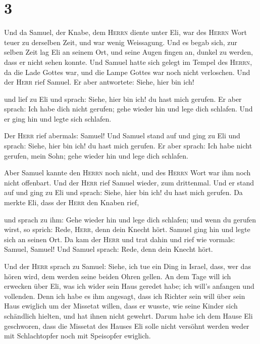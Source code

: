 \hypertarget{section-2}{%
\section{3}\label{section-2}}

 Und da Samuel, der Knabe, dem \textsc{Herrn} diente unter
Eli, war des \textsc{Herrn} Wort teuer zu derselben Zeit, und war wenig
Weissagung.  Und es begab sich, zur selben Zeit lag Eli an
seinem Ort, und seine Augen fingen an, dunkel zu werden, dass er nicht
sehen konnte.  Und Samuel hatte sich gelegt im Tempel des
\textsc{Herrn}, da die Lade Gottes war, und die Lampe Gottes war noch
nicht verloschen.  Und der \textsc{Herr} rief Samuel. Er
aber antwortete: Siehe, hier bin ich!

 und lief zu Eli und sprach: Siehe, hier bin ich! du hast
mich gerufen. Er aber sprach: Ich habe dich nicht gerufen; gehe wieder
hin und lege dich schlafen. Und er ging hin und legte sich schlafen.

 Der \textsc{Herr} rief abermals: Samuel! Und Samuel stand
auf und ging zu Eli und sprach: Siehe, hier bin ich! du hast mich
gerufen. Er aber sprach: Ich habe nicht gerufen, mein Sohn; gehe wieder
hin und lege dich schlafen.

 Aber Samuel kannte den \textsc{Herrn} noch nicht, und des
\textsc{Herrn} Wort war ihm noch nicht offenbart.  Und der
\textsc{Herr} rief Samuel wieder, zum drittenmal. Und er stand auf und
ging zu Eli und sprach: Siehe, hier bin ich! du hast mich gerufen. Da
merkte Eli, dass der \textsc{Herr} den Knaben rief,

 und sprach zu ihm: Gehe wieder hin und lege dich
schlafen; und wenn du gerufen wirst, so sprich: Rede, \textsc{Herr},
denn dein Knecht hört. Samuel ging hin und legte sich an seinen Ort.
 Da kam der \textsc{Herr} und trat dahin und rief wie
vormals: Samuel, Samuel! Und Samuel sprach: Rede, denn dein Knecht hört.

 Und der \textsc{Herr} sprach zu Samuel: Siehe, ich tue
ein Ding in Israel, dass, wer das hören wird, dem werden seine beiden
Ohren gellen.  An dem Tage will ich erwecken über Eli,
was ich wider sein Haus geredet habe; ich will's anfangen und vollenden.
 Denn ich habe es ihm angesagt, dass ich Richter sein
will über sein Haus ewiglich um der Missetat willen, dass er wusste, wie
seine Kinder sich schändlich hielten, und hat ihnen nicht gewehrt.
 Darum habe ich dem Hause Eli geschworen, dass die
Missetat des Hauses Eli solle nicht versöhnt werden weder mit
Schlachtopfer noch mit Speisopfer ewiglich.

